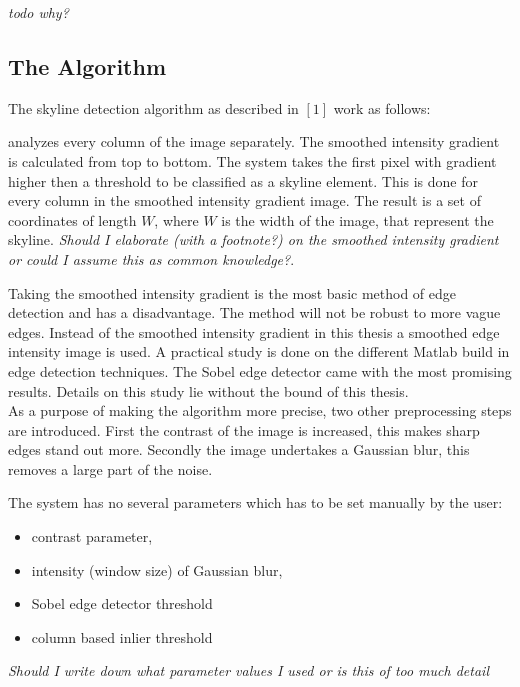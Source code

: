 \documentclass[10pt]{article}
\begin{document}

\textit{todo why?}


 \subsection{The Algorithm}
The skyline detection algorithm as described in $[1]$ work as follows:

analyzes every column of
the image separately.  The smoothed intensity gradient is calculated from top
to bottom.  The system takes the first pixel with gradient higher then a threshold to be
classified as a skyline element.  This is done for every column in the smoothed
intensity gradient image. The result is a set of coordinates of length $W$,
where $W$ is the width of the image, that represent the skyline.
\textit{Should I elaborate (with a footnote?) on the smoothed
intensity gradient or could I assume this as common knowledge?}. 

Taking the smoothed intensity gradient is the most basic method of edge detection
and has a disadvantage. The method will not be robust to more vague edges.
Instead of the smoothed intensity gradient in this thesis a smoothed edge intensity image is
used.  A practical study is done on the different Matlab build in edge
detection techniques. The Sobel edge detector came with the most promising
results.  Details on this study lie without the bound of this thesis.\\

As a purpose of making the algorithm more precise, two other preprocessing
steps are introduced. First the contrast of the image is increased, this makes
sharp edges stand out more.  Secondly the image undertakes a Gaussian blur,
this removes a large part of the noise.

The system has no several parameters which has to be set manually by the user:
\begin{itemize}
\item contrast parameter, 
\item intensity (window size) of Gaussian blur,
\item Sobel edge detector threshold
\item column based inlier threshold
\end{itemize}
\textit{Should I write down what parameter values I used or is this of too much
detail}
\end{document}
